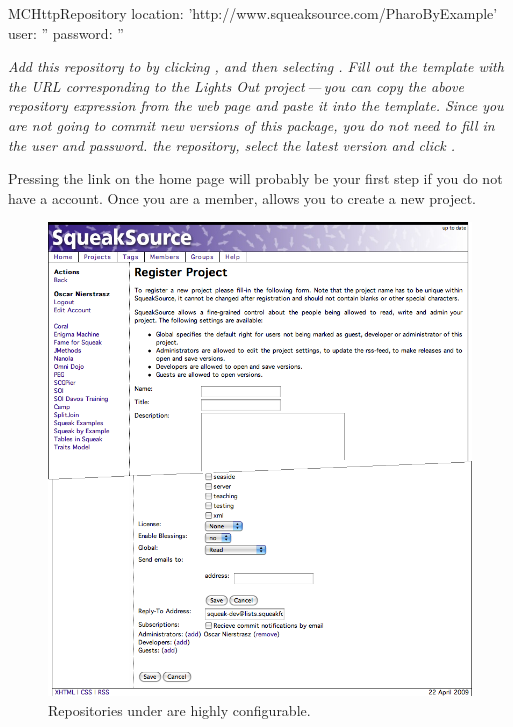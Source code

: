 \documentclass[a4paper,10pt,twoside]{book}
\begin{document}
\begin{code}{}
MCHttpRepository
    location: 'http://www.squeaksource.com/PharoByExample'
    user: ''
    password: ''
\end{code}
\noindent
\emph{Add this repository to \MC by clicking , and then selecting . Fill out the template with the URL corresponding to the Lights Out project\,---\,you can copy the above repository expression from the web page and paste it into the template.
Since you are not going to commit new versions of this package, you do not need to fill in the user and password.
 the repository, select the latest version and click .}

Pressing the  link on the \sqsrc home page will probably be your first step if you do not have a \sqsrc account. 
Once you are a member,  allows you to create a new project. 


\begin{figure}[ht]\centering
	\includegraphics[width=\textwidth]{squeaksourcesetting}
	\caption{Repositories under \sqsrc are highly configurable.}
\end{figure}
\end{document}
